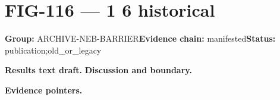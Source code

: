 \clearpage
\section{FIG-116 --- 1 6 historical}
\label{figpage:fig-116}
\textbf{Group:} ARCHIVE-NEB-BARRIER\quad \textbf{Evidence chain:} manifested\quad \textbf{Status:} publication;old\_or\_legacy

\textbf{Results text draft.} 
\textbf{Discussion and boundary.} 


\textbf{Evidence pointers.}



\vfill
